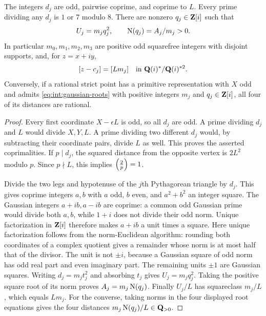 \begin{theorem}\label{int:gaussian}
The integers $d_j$ are odd, pairwise coprime, and coprime to $L$.
Every prime dividing any $d_j$ is $1$ or $7$ modulo $8$. There are
nonzero $q_j\in\mathbf Z[i]$ such that
\begin{equation}\label{eq:int:gaussian-roots}
 U_j=m_jq_j^2,\qquad \operatorname{N}(q_j)=A_j/m_j>0.
\end{equation}
In particular $m_0,m_1,m_2,m_3$ are positive odd squarefree integers
with disjoint supports, and, for $z=x+iy$,
\begin{equation}\label{eq:int:gaussian-classes}
 [z-c_j]=[Lm_j]\quad\text{in }\mathbf Q(i)^*/\mathbf Q(i)^{*2}.
\end{equation}
Conversely, if a rational strict point has a primitive representation
with $X$ odd and admits \eqref{eq:int:gaussian-roots} with positive
integers $m_j$ and $q_j\in\mathbf Z[i]$, all four of its distances are rational.
\end{theorem}

\begin{proof}
Every first coordinate $X-\epsilon L$ is odd, so all $d_j$ are odd.
A prime dividing $d_j$ and $L$ would divide $X,Y,L$. A prime dividing
two different $d_j$ would, by subtracting their coordinate pairs,
divide $L$ as well. This proves the asserted coprimalities.
If $p\mid d_j$, the squared distance from the opposite vertex is
$2L^2$ modulo $p$. Since $p\nmid L$, this implies $\left(\frac{2}{p}\right)=1$.

Divide the two legs and hypotenuse of the $j$th Pythagorean triangle
by $d_j$. This gives coprime integers $a,b$ with $a$ odd, $b$ even,
and $a^2+b^2$ an integer square. The Gaussian integers $a+ib,a-ib$
are coprime: a common odd Gaussian prime would divide both $a,b$,
while $1+i$ does not divide their odd norm. Unique factorization in
$\mathbf Z[i]$ therefore makes $a+ib$ a unit times a square. Here unique
factorization follows from the norm-Euclidean algorithm: rounding both
coordinates of a complex quotient gives a remainder whose norm is
at most half that of the divisor. The unit is
not $\pm i$, because a Gaussian square of odd norm has odd real
part and even imaginary part. The remaining units $\pm1$ are
Gaussian squares. Writing $d_j=m_jt_j^2$ and absorbing $t_j$ gives
$U_j=m_jq_j^2$. Taking the positive square root of its norm proves
$A_j=m_j\operatorname{N}(q_j)$. Finally $U_j/L$ has squareclass $m_j/L$, which
equals $Lm_j$. For the converse, taking norms in the four displayed
root equations gives the four distances
$m_j\operatorname{N}(q_j)/L\in\mathbf Q_{>0}$.
\end{proof}

